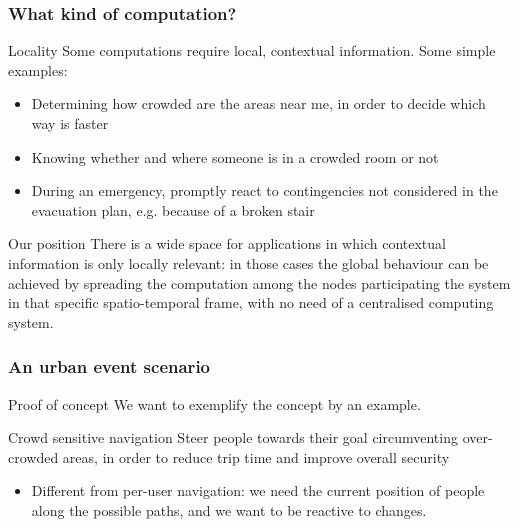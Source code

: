 \documentclass[presentation]{beamer}
\begin{document}
\begin{frame}\frametitle{What kind of computation?}
  \begin{block}{Locality}
    Some computations require local, contextual information. Some simple examples:
    \begin{itemize}
     \item Determining how crowded are the areas near me, in order to decide which way is faster
     \item Knowing whether and where someone is in a crowded room or not
     \item During an emergency, promptly react to contingencies not considered in the evacuation plan, e.g. because of a broken stair
    \end{itemize}
  \end{block}
  \begin{block}{Our position}
    There is a wide space for applications in which contextual information is only locally relevant: in those cases the global behaviour can be achieved by spreading the computation among the nodes participating the system in that specific spatio-temporal frame, with no need of a centralised computing system.
  \end{block}
\end{frame}

\begin{frame}\frametitle{An urban event scenario}
  \begin{block}{Proof of concept}
    We want to exemplify the concept by an example.
  \end{block}
  \begin{block}{Crowd sensitive navigation}
    Steer people towards their goal circumventing over-crowded areas, in order to reduce trip time and improve overall security
    \begin{itemize}
     \item Different from per-user navigation: we need the current position of people along the possible paths, and we want to be reactive to changes.
    \end{itemize}
  \end{block}
\end{frame}
\end{document}
